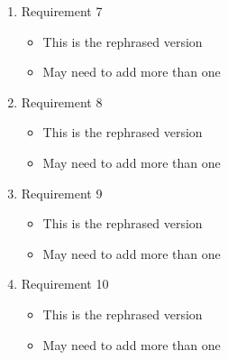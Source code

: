 \documentclass[a4paper,12pt]{article}
\begin{document}
\begin{enumerate}
\begin{itemize}
	\end{itemize}
\item Requirement 7
	\begin{itemize}
	\item This is the rephrased version
	\item May need to add more than one 
	\end{itemize}
\item Requirement 8
	\begin{itemize}
	\item This is the rephrased version
	\item May need to add more than one 
	\end{itemize}
\item Requirement 9
	\begin{itemize}
	\item This is the rephrased version
	\item May need to add more than one 
	\end{itemize}
\item Requirement 10
	\begin{itemize}
	\item This is the rephrased version
	\item May need to add more than one 
	\end{itemize}
\end{enumerate}
\end{document}
